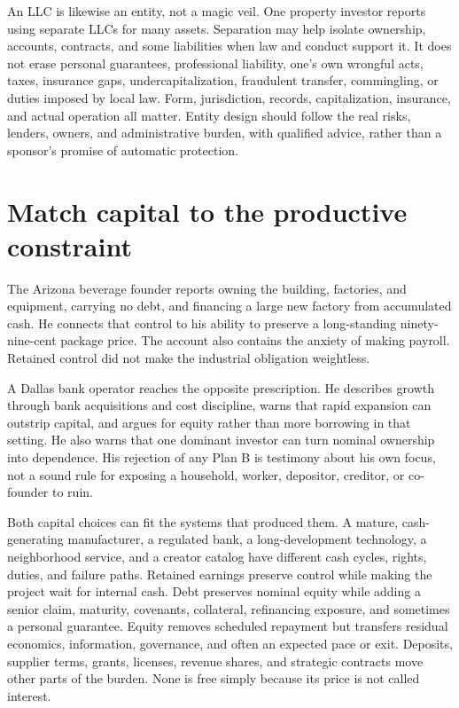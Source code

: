 An LLC is likewise an entity, not a magic veil. One property investor reports
using separate LLCs for many assets. Separation may help isolate ownership,
accounts, contracts, and some liabilities when law and conduct support it. It
does not erase personal guarantees, professional liability, one's own wrongful
acts, taxes, insurance gaps, undercapitalization, fraudulent transfer,
commingling, or duties imposed by local law. Form, jurisdiction, records,
capitalization, insurance, and actual operation all matter. Entity design
should follow the real risks, lenders, owners, and administrative burden, with
qualified advice, rather than a sponsor's promise of automatic protection.

\section{Match capital to the productive constraint}

The Arizona beverage founder reports owning the building, factories, and
equipment, carrying no debt, and financing a large new factory from accumulated
cash. He connects that control to his ability to preserve a long-standing
ninety-nine-cent package price. The account also contains the anxiety of making
payroll. Retained control did not make the industrial obligation weightless.

A Dallas bank operator reaches the opposite prescription. He describes growth
through bank acquisitions and cost discipline, warns that rapid expansion can
outstrip capital, and argues for equity rather than more borrowing in that
setting. He also warns that one dominant investor can turn nominal ownership
into dependence. His rejection of any Plan B is testimony about his own focus,
not a sound rule for exposing a household, worker, depositor, creditor, or
co-founder to ruin.

Both capital choices can fit the systems that produced them. A mature,
cash-generating manufacturer, a regulated bank, a long-development technology,
a neighborhood service, and a creator catalog have different cash cycles,
rights, duties, and failure paths. Retained earnings preserve control while
making the project wait for internal cash. Debt preserves nominal equity while
adding a senior claim, maturity, covenants, collateral, refinancing exposure,
and sometimes a personal guarantee. Equity removes scheduled repayment but
transfers residual economics, information, governance, and often an expected
pace or exit. Deposits, supplier terms, grants, licenses, revenue shares, and
strategic contracts move other parts of the burden. None is free simply because
its price is not called interest.

